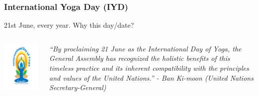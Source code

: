 \begin{frame}[fragile]\frametitle{International Yoga Day (IYD)}
21st June, every year. Why this day/date?

   \begin{columns}
    \begin{column}[t]{0.4\linewidth}
	
\begin{center}
\includegraphics[width=0.5\linewidth,keepaspectratio]{images/yog16}
\end{center}


    \end{column}
    \begin{column}[t]{0.6\linewidth}
		\begin{center}
		\textit{``By proclaiming 21 June as the International Day of Yoga, the General Assembly has recognized the holistic benefits of this timeless practice and its inherent compatibility with the principles and values of the United Nations.'' -    Ban Ki-moon (United Nations Secretary-General)}
	\end{center}

    \end{column}
  \end{columns}

\end{frame}


